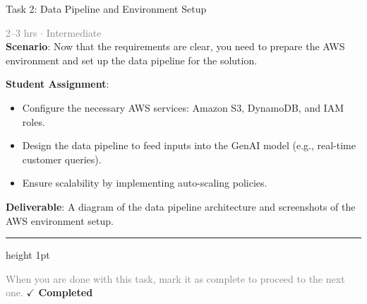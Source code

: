 \documentclass[10pt,a4paper]{article}
\begin{document}
\begin{taskbox}{Task 2: Data Pipeline and Environment Setup}

    {\small \textcolor{gray}{2--3 hrs $\cdot$ Intermediate}}\\[12pt]

    \textbf{Scenario}: Now that the requirements are clear, you need to prepare the AWS environment and set up the data pipeline for the solution.  

\textbf{Student Assignment}:  
\begin{itemize}
    \item Configure the necessary AWS services: Amazon S3, DynamoDB, and IAM roles.  
    \item Design the data pipeline to feed inputs into the GenAI model (e.g., real-time customer queries).  
    \item Ensure scalability by implementing auto-scaling policies.  
\end{itemize}

\textbf{Deliverable}: A diagram of the data pipeline architecture and screenshots of the AWS environment setup.\par

    \vspace{16pt}

    \textcolor{cardBorder}{\hrule height 1pt}\vspace{8pt}

    \small \textcolor{gray}{When you are done with this task, mark it as complete to proceed to the next one.} \hfill \textbf{\textcolor{brandDark}{$\checkmark$ Completed}}

\end{taskbox}
\end{document}
